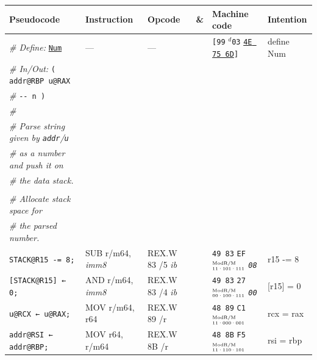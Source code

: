 \documentclass[a4paper,12pt,final]{article}
\begin{document}
\begin{table}[!htbp] \begin{adjustwidth}{-1cm}{-1cm} \fontsize{10}{12.000000}\selectfont
\begin{center}
\begin{tabular}{l|ll|l|lH}
\textbf{Pseudocode} & \textbf{Instruction} & \textbf{Opcode} & \textbf{\&} & \textbf{Machine code} & \textbf{Intention}\\[0pt]
\hline
\emph{\# Define:} \uline{\texttt{Num}} & --- & --- &  & \texttt{[99} \(^{d}\)​\texttt{03} \uline{\texttt{4E 75 6D}}​\texttt{]} & define Num\\[0pt]
\emph{\# In/Out:}    \texttt{( addr@RBP u@RAX} &  &  &  &  & \\[0pt]
\emph{\#}\hspace{3.35em} \texttt{-​- n )} &  &  &  &  & \\[0pt]
\emph{\#} &  &  &  &  & \\[0pt]
\emph{\# Parse string given by \texttt{addr}​/​\texttt{u}} &  &  &  &  & \\[0pt]
\emph{\# as a number and push it on} &  &  &  &  & \\[0pt]
\emph{\# the data stack.} &  &  &  &  & \\[0pt]
 &  &  &  &  & \\[0pt]
\hspace{1.053000em} \emph{\# Allocate stack space for} &  &  &  &  & \\[0pt]
\hspace{1.053000em} \emph{\# the parsed number.} &  &  &  &  & \\[0pt]
\hspace{1.053000em} \texttt{STACK@R15 -= 8;} & SUB r/m64, \emph{imm8} & REX.W 83 /​5 \emph{ib} &  & \texttt{49 83} \texttt{EF}​\(^{\text{\tiny ModR/M}}_{\text{\tiny 11·101·111}}\) \emph{\texttt{08}} & r15 -= 8\\[0pt]
\hspace{1.053000em} \texttt{[STACK@R15] ← 0;} & AND r/m64, \emph{imm8} & REX.W 83 /​4 \emph{ib} &  & \texttt{49 83} \texttt{27}​\(^{\text{\tiny ModR/M}}_{\text{\tiny 00·100·111}}\) \emph{\texttt{00}} & [r15] = 0\\[0pt]
\hspace{1.053000em} \texttt{u@RCX ← u@RAX;} & MOV r/m64, r64 & REX.W 89 /r &  & \texttt{48 89} \texttt{C1}​\(^{\text{\tiny ModR/M}}_{\text{\tiny 11·000·001}}\) & rcx = rax\\[0pt]
\hspace{1.053000em} \texttt{addr@RSI ← addr@RBP;} & MOV r64, r/m64 & REX.W 8B /r &  & \texttt{48 8B} \texttt{F5}​\(^{\text{\tiny ModR/M}}_{\text{\tiny 11·110·101}}\) & rsi = rbp\\[0pt]

\end{tabular}
\end{center}
\end{adjustwidth}
\end{table}
\end{document}
